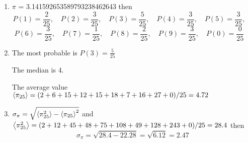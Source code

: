 \documentclass[12pt]{exam}
\begin{document}
\begin{solution}
    \begin{enumerate}
        \item $\pi$ = 3.141592653589793238462643 then $$
        P(1) = \frac{2}{25}, \quad
        P(2) = \frac{3}{25}, \quad
        P(3) = \frac{5}{25}, \quad
        P(4) = \frac{3}{25}, \quad
        P(5) = \frac{3}{25}, \quad
        $$$$
        P(6) = \frac{3}{25}, \quad
        P(7) = \frac{1}{25}, \quad
        P(8) = \frac{2}{25}, \quad
        P(9) = \frac{3}{25}, \quad
        P(0) = \frac{0}{25} \quad$$

        \item The most probable is $P(3) = \frac{5}{25}$ 

        The median is $4$.

        The average value $\expval{\pi_{25}} = (2 + 6 + 15 + 12 + 15 + 18 + 7 + 16 + 27 + 0)/25 = 4.72$

        \item $\sigma_\pi = \sqrt{\expval{\pi_{25}^2} - \expval{\pi_{25}}^2}$ and $\expval{\pi_{25}^2} = (2 + 12 + 45 + 48  + 75 + 108 + 49 + 128 + 243 + 0)/25 = 28.4$ then $$\sigma_\pi = \sqrt{28.4 - 22.28} = \sqrt{6.12} = 2.47$$
    \end{enumerate}
    
\end{solution}
\end{document}
